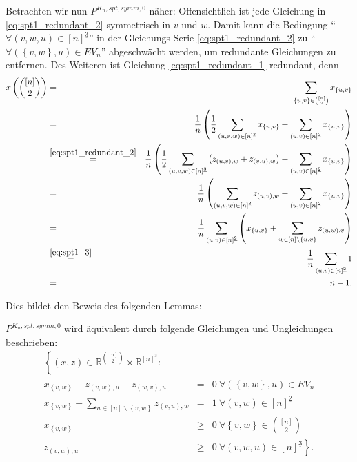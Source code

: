 \documentclass[10p,a4paper,BCOR = 12mm, DIV=15]{scrbook}
\begin{document}
Betrachten wir nun $P^{K_n, spt, symm, 0}$ näher: Offensichtlich ist jede Gleichung in \eqref{eq:spt1_redundant_2} symmetrisch in $v$ und $w$. Damit kann die Bedingung "`$\forall \left(v, w, u\right)\in [n]^{\underline{3}}$"' in der Gleichungs-Serie \eqref{eq:spt1_redundant_2} zu "`$\forall \left(\left\{v, w\right\}, u\right)\in EV_n$"' abgeschwächt werden, um redundante Gleichungen zu entfernen. Des Weiteren ist Gleichung \eqref{eq:spt1_redundant_1} redundant, denn
{
\allowdisplaybreaks
\begin{eqnarray*}
x\left({\left[n\right] \choose 2}\right) & = & \sum_{\left\{u, v\right\} \in {\left[n\right] \choose 2}} x_{\left\{u, v\right\}} \\
& = & \frac{1}{n} \left(\frac{1}{2} \sum_{\left(u, v, w\right) \in \left[n\right]^{\underline{3}}} x_{\left\{u, v\right\}} + \sum_{\left(u, v\right) \in \left[n\right]^{\underline{2}}} x_{\left\{u, v\right\}} \right) \\
& \stackrel{\eqref{eq:spt1_redundant_2}}{=} & \frac{1}{n} \left(\frac{1}{2} \sum_{\left(u, v, w\right) \in \left[n\right]^{\underline{3}}} \left(z_{\left(u, v\right), w} + z_{\left(v, u\right), w}\right) + \sum_{\left(u, v\right) \in \left[n\right]^{\underline{2}}} x_{\left\{u, v\right\}} \right) \\
& = & \frac{1}{n} \left(\sum_{\left(u, v, w\right) \in \left[n\right]^{\underline{3}}} z_{\left(u, v\right), w} + \sum_{\left(u, v\right) \in \left[n\right]^{\underline{2}}} x_{\left\{u, v\right\}} \right) \\
& = & \frac{1}{n} \sum_{\left(u, v\right) \in \left[n\right]^{\underline{2}}} \left( x_{\left\{u, v\right\}} + \sum_{w \in \left[n\right] \backslash \left\{u, v\right\}} z_{\left(u, w\right), v} 
\right) \\
& \stackrel{\eqref{eq:spt1_3}}{=} & \frac{1}{n} \sum_{\left(u, v\right) \in \left[n\right]^{\underline{2}}} 1 \\
& = & n-1.
\end{eqnarray*}
}

Dies bildet den Beweis des folgenden Lemmas:

\begin{Le}
\label{le:spt_erweitert_2}
$P^{K_n, spt, symm, 0}$ wird äquivalent durch folgende Gleichungen und Ungleichungen beschrieben:
\begin{eqnarray}
\left\{(x, z)\in\mathbb{R}^{[n]\choose 2}\times \mathbb{R}^{[n]^{\underline{3}}}:\right. & & \nonumber \\
x_{\left\{v, w\right\}} - z_{\left(v, w\right), u} - z_{\left(w, v\right), u} & = & 0\ \forall \left(\left\{v, w\right\}, u\right)\in EV_n \label{eq:spt_erweitert_2_1} 
\\
x_{\left\{v, w\right\}} + \sum_{u\in[n]\backslash\left\{v, w\right\}} z_{\left(v, u\right), w} & = & 1\ \forall \left(v, w\right)\in [n]^{\underline{2}} \label{eq:spt_erweitert_2_2} 
\\
x_{\left\{v, w\right\}} & \geq & 0\ \forall \left\{v, w\right\}\in {[n] \choose 2} \nonumber \\
z_{\left(v, w\right), u} & \geq & \left.0\ \forall \left(v, w, u\right)\in [n]^{\underline{3}} \nonumber \right\}.
\end{eqnarray}
\end{Le}
\end{document}
